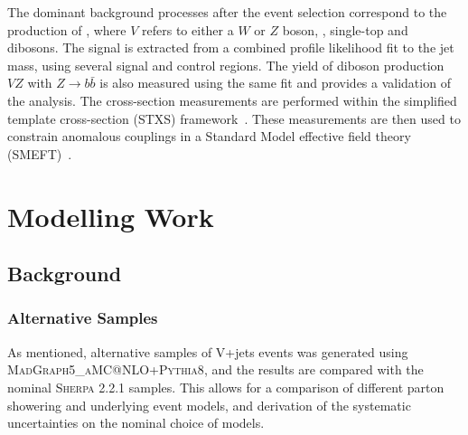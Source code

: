 The dominant background processes after the event selection correspond
to the production of \vjets, where $V$ refers to either a $W$ or $Z$
boson, \ttbar, single-top and dibosons.  The signal is extracted from
a combined profile likelihood fit to the \largeR jet mass, using
several signal and control regions. The yield of diboson production
$VZ$ with $Z \rightarrow b\bar{b}$ is also measured using the same fit
and provides a validation of the analysis. The cross-section
measurements are performed within the simplified template
cross-section (STXS) framework~\cite{deFlorian:2016spz,
Badger:2016bpw}. These measurements are then used to constrain
anomalous couplings in a Standard Model effective field theory
(SMEFT)~\cite{Contino:2013kra}.








\section{Modelling Work}

\subsection{Background}
%

%
\subsubsection{Alternative Samples}
As mentioned, alternative samples of V+jets events was generated using \textsc{MadGraph5\_aMC@NLO+Pythia8}, and the results are compared with the nominal \textsc{Sherpa 2.2.1} samples. This allows for a comparison of different parton showering and underlying event models, and derivation of the systematic uncertainties on the nominal choice of models.

